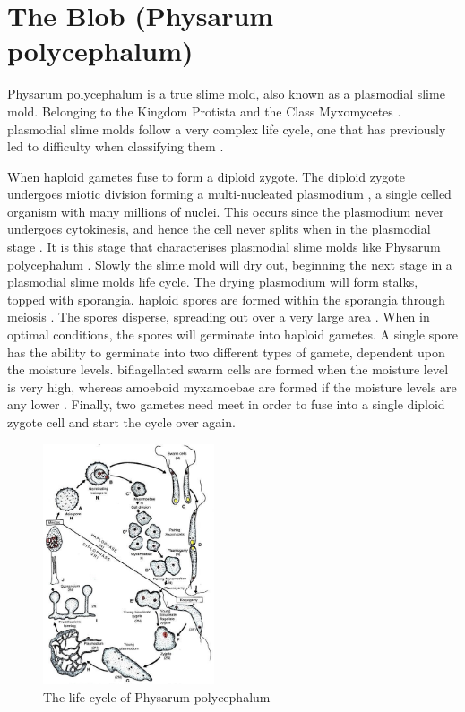 \documentclass[]{report}
\begin{document}
\section{The Blob (Physarum polycephalum)}
\Gls{Physarum polycephalum} is a \gls{true slime mold}, also known as a \gls{plasmodial slime mold}. Belonging to the Kingdom Protista and the Class Myxomycetes \cite{noauthor_uwl_nodate, noauthor_slime_nodate}. \Glspl{plasmodial slime mold} follow a very complex life cycle, one that has previously led to difficulty when classifying them \cite{armstrong_slime_2020}. 

When \gls{haploid} \glspl{gamete} fuse to form a \gls{diploid} \gls{zygote}. The \gls{diploid} \gls{zygote} undergoes \gls{miotic division} forming a \gls{multi-nucleated} plasmodium \cite{kritartha_life_2016}, a single celled organism with many millions of nuclei. This occurs since the plasmodium never undergoes \gls{cytokinesis}, and hence the cell never splits when in the plasmodial stage \cite{kritartha_life_2016}. It is this stage that characterises \glspl{plasmodial slime mold} like \Gls{Physarum polycephalum} \cite{jabr_how_2012}. Slowly the slime mold will dry out, beginning the next stage in a \glspl{plasmodial slime mold} life cycle. The drying plasmodium will form stalks, topped with \gls{sporangia}. \Gls{haploid} spores are formed within the \gls{sporangia} through \gls{meiosis} \cite{kritartha_life_2016}. The spores disperse, spreading out over a very large area \cite{Britannica_slime_2019}. When in optimal conditions, the spores will germinate into \gls{haploid} gametes. A single spore has the ability to germinate into two different types of gamete, dependent upon the moisture levels. \Glspl{biflagellated swarm cell} are formed when the moisture level is very high, whereas \gls{amoeboid myxamoebae} are formed if the moisture levels are any lower \cite{Britannica_slime_2019}. Finally, two gametes need meet in order to fuse into a single \gls{diploid} \gls{zygote} cell and start the cycle over again\cite{kritartha_life_2016, Britannica_slime_2019, jabr_how_2012}.

\begin{figure}
    \centering
    \includegraphics[width = 0.45\textwidth]{images/PhysarumPolycephalum.jpg}
    \caption{The life cycle of \Gls{Physarum polycephalum} \cite{kritartha_life_2016}}
\end{figure}
\end{document}
